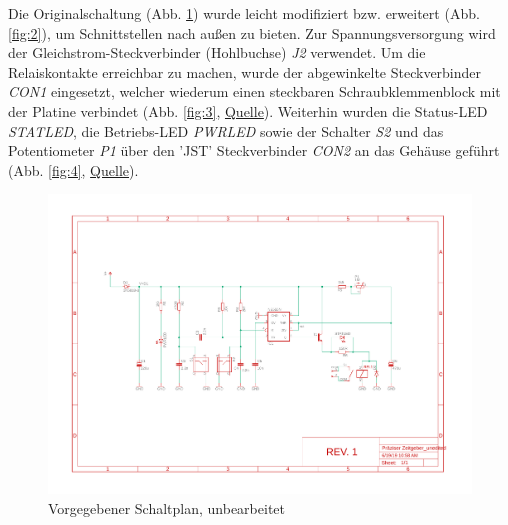 \documentclass[a4paper, 12pt]{article}
\begin{document}
      Die Originalschaltung (Abb. \ref{fig:1}) wurde leicht modifiziert bzw. erweitert (Abb. \ref{fig:2}), um Schnittstellen nach außen zu bieten. Zur Spannungsversorgung wird der Gleichstrom-Steckverbinder (Hohlbuchse) \emph{J2} verwendet. Um die Relaiskontakte erreichbar zu machen, wurde der abgewinkelte Steckverbinder \emph{CON1} eingesetzt, welcher wiederum einen steckbaren Schraubklemmenblock mit der Platine verbindet (Abb. \ref{fig:3}, \href{https://images-na.ssl-images-amazon.com/images/I/41ZSSt30GrL._SX342_.jpg}{Quelle}). Weiterhin wurden die Status-LED \emph{STATLED}, die Betriebs-LED \emph{PWRLED} sowie der Schalter \emph{S2} und das Potentiometer \emph{P1} über den 'JST' Steckverbinder \emph{CON2} an das Gehäuse geführt (Abb. \ref{fig:4}, \href{https://s14-eu5.startpage.com/cgi-bin/serveimage?url=https%3A%2F%2Fimg.staticbg.com%2Fimages%2Foaupload%2Fbanggood%2Fimages%2F12%2F22%2Ffd817233-0dd3-47b9-8bd6-c45dc5c2771b.JPG&sp=997ca376a7aab4a06e5f92eaaa79fe61}{Quelle}).\\

        \begin{figure}[H]
        \centering
        \includegraphics[page=1, scale=0.5]{graphics/PZ_unedited.pdf}
        \caption{Vorgegebener Schaltplan, unbearbeitet}
        \label{fig:1}
        \end{figure}
\end{document}
